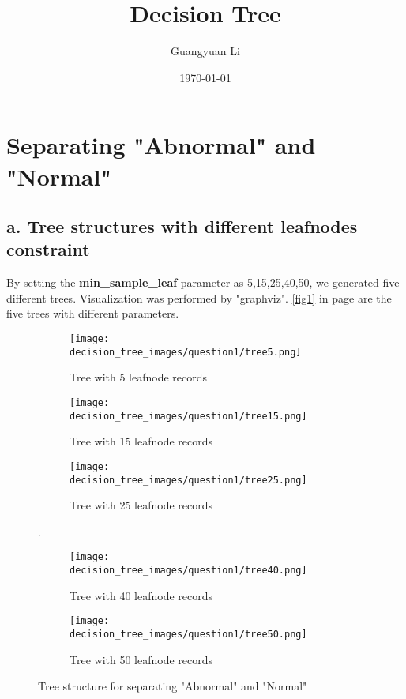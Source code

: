 \documentclass{article}
\title{Decision Tree}
\author{Guangyuan Li}
\date{\today{}}
\begin{document}
\maketitle

\section{Separating "Abnormal" and "Normal"}
\subsection*{a. Tree structures with different leafnodes constraint}
By setting the \textbf{min\_sample\_leaf} parameter as 5,15,25,40,50, we generated five different trees. Visualization was performed by "graphviz". \autoref{fig1} in page \pageref{fig1} are the five trees with different parameters.

\begin{figure}[h]
    \centering
    \begin{subfigure}[h]{.45\linewidth}
    \texttt{[image: decision\_tree\_images/question1/tree5.png]}
    \caption{Tree with 5 leafnode records}
    \label{q1_tree5}
    \end{subfigure}
    
    \begin{subfigure}[h]{.45\linewidth}
    \texttt{[image: decision\_tree\_images/question1/tree15.png]}
    \caption{Tree with 15 leafnode records}
    \label{q1_tree15}
    \end{subfigure}
    \begin{subfigure}[h]{.45\linewidth}
    \texttt{[image: decision\_tree\_images/question1/tree25.png]}
    \caption{Tree with 25 leafnode records}
    \label{fig1_tree5}
    \end{subfigure}. %
    
    \begin{subfigure}[h]{.45\linewidth}
    \texttt{[image: decision\_tree\_images/question1/tree40.png]}
    \caption{Tree with 40 leafnode records}
    \label{q1_tree40}
    \end{subfigure}
    \begin{subfigure}[h]{.45\linewidth}
    \texttt{[image: decision\_tree\_images/question1/tree50.png]}
    \caption{Tree with 50 leafnode records}
    \label{q1_tree50}
    \end{subfigure} 
    
    \caption{Tree structure for separating "Abnormal" and "Normal"}
    \label{fig1}
\end{figure}
\end{document}

